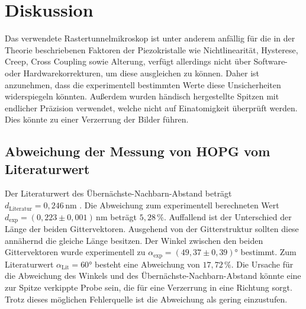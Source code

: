 \section{Diskussion}
\label{sec:Diskussion}
Das verwendete Rastertunnelmikroskop ist unter anderem anfällig für die in der Theorie beschriebenen Faktoren der Piezokristalle wie Nichtlinearität, Hysterese, Creep, Cross Coupling sowie Alterung, verfügt allerdings nicht über Software- oder Hardwarekorrekturen, um diese ausgleichen zu können. Daher ist anzunehmen, dass die experimentell bestimmten Werte diese Unsicherheiten widerspiegeln könnten. 
Außerdem wurden händisch hergestellte Spitzen mit endlicher Präzision verwendet, welche nicht auf Einatomigkeit überprüft werden. Dies könnte zu einer Verzerrung der Bilder führen.


\subsection{Abweichung der Messung von HOPG vom Literaturwert}
Der Literaturwert des Übernächste-Nachbarn-Abstand beträgt $d_{\text{Literatur}} = 0,246 \, \unit{\nano\meter}$ \cite{ScanningTunnelingMicroscopy}. Die Abweichung zum experimentell berechneten Wert $d_{\text{exp}} = (0,223 \pm 0,001)  \, \unit{\nano\meter}$ beträgt $5,28 \, \%$. Auffallend ist der Unterschied der Länge der beiden Gittervektoren. Ausgehend von der Gitterstruktur sollten diese annähernd die gleiche Länge besitzen. Der Winkel zwischen den beiden Gittervektoren wurde experimentell zu $\alpha_{\text{exp}} = (49,37 \pm 0,39)°$ bestimmt. Zum Literaturwert $\alpha_{\text{Lit}} = 60°$ besteht eine Abweichung von $17,72 \, \%$. Die Ursache für die Abweichung des Winkels und des Übernächste-Nachbarn-Abstand könnte eine zur Spitze verkippte Probe sein, die für eine Verzerrung in eine Richtung sorgt. Trotz dieses möglichen Fehlerquelle ist die Abweichung als gering einzustufen. 


